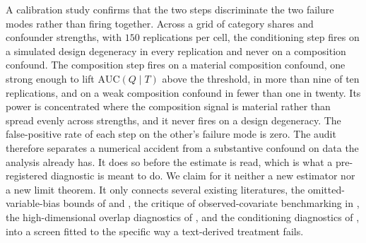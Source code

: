 A calibration study confirms that the two steps discriminate the two failure modes
rather than firing together. Across a grid of category shares and confounder strengths, with $150$ replications per cell, the conditioning step fires on a simulated design degeneracy in every replication and never on a composition confound. The composition step fires on a material composition confound, one strong enough to lift $\mathrm{AUC}(Q \mid T)$ above the threshold, in more than nine of ten replications, and on a weak composition confound in fewer than one in twenty. Its power is concentrated where the composition signal is material rather than spread evenly across strengths, and it never fires on a design degeneracy. The false-positive rate of each step on the other's failure mode is zero. The audit therefore separates a numerical accident from a substantive confound on data the analysis already has. It does so before the estimate is read, which is what a pre-registered diagnostic is meant to do. We claim for it neither a new estimator nor a new limit theorem. It only connects several existing literatures, the omitted-variable-bias bounds of \citet{cinelli2020making} and \citet{chernozhukov2022long}, the critique of observed-covariate benchmarking in \citet{diegert2026axiomatic}, the high-dimensional overlap diagnostics of \citet{damour2021overlap}, and the conditioning diagnostics of \citet{saco2025illconditioned}, into a screen fitted to the specific way a text-derived treatment fails.
